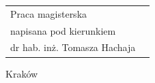 \begin{titlepage}
\begin{center}
        \begin{flushright}
            \large
            \begin{tabular}{ll}
                Praca magisterska       \\
                napisana pod kierunkiem \\
                dr hab. inż. Tomasza Hachaja
            \end{tabular}
        \end{flushright}


        \vfill

        {\large Kraków \the\year}

    \end{center}
\end{titlepage}